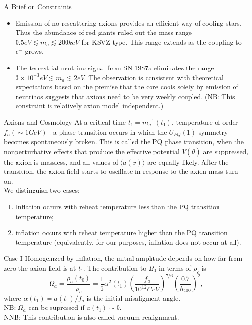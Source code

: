 \documentclass{beamer}
\begin{document}
\begin{frame}{A Brief on Constraints}
\begin{itemize}
\item Emission of no-rescattering axions provides an efficient way of cooling stars. Thus the abundance of red giants ruled out the mass range $0.5 eV \lesssim m_a \lesssim 200keV$ for KSVZ type. This range extends as the coupling to $e^-$ grows.
\item The terrestrial neutrino signal from SN 1987a eliminates the range $3 \times 10^{-3} eV \lesssim m_a \lesssim 2 eV$. The observation is consistent with theoretical expectations based on the premise that the core cools solely by emission of neutrinos suggests that axions need to be very weekly coupled. (NB: This constraint is relatively axion model independent.)
\end{itemize}
\end{frame}
\begin{frame}{Axions and Cosmology}
At a critical time $t_1 = m_a^{-1}(t_1)$, temperature of order $f_a (\sim 1 GeV)$ , a phase transition occurs in which the $U_{PQ}(1)$ symmetry becomes spontaneously broken. This is called the PQ phase transition, when the nonperturbative effects that produce the effective potential $V(\bar{\theta})$ are suppressed, the axion is massless,
and all values of $\langle a(x) \rangle$ are equally likely. After the transition, the axion field starts to oscillate in response to the axion mass turn-on.\\
We distinguish two cases:
\begin{enumerate}
\item Inflation occurs with reheat temperature less than the PQ transition temperature;
\item inflation occurs with reheat temperature higher than the PQ transition temperature (equivalently, for our purposes, inflation does not occur at all). 
\end{enumerate}
\end{frame}
\begin{frame}{Case I}
Homogenized by inflation, the initial amplitude depends on how far from zero the axion field is at $t_1$. The contribution to $\Omega_0$ in terms of $\rho_c$ is$$
\Omega_a = \frac{\rho_a(t_0)}{\rho_c} = \frac{1}{6}\alpha^2(t_1)(\frac{f_a}{10^{12}GeV})^{7/6}(\frac{0.7}{h_{100}})^2,$$
where $\alpha(t_1) = a(t_1)/f_a$ is the initial misaligment angle.\\
\vspace{1cm}
NB: $\Omega_a$ can be supressed if $a(t_1) \sim 0$. \\
NNB: This contribution is also called \alert{vacuum realignment}.
\end{frame}
\end{document}

